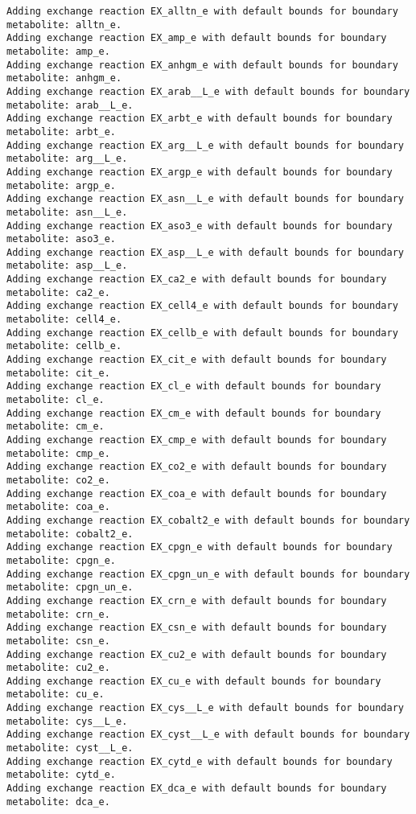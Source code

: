 \documentclass[
  letterpaper,
  DIV=11,
  numbers=noendperiod]{scrartcl}
\begin{document}
\begin{verbatim}
Adding exchange reaction EX_alltn_e with default bounds for boundary metabolite: alltn_e.
Adding exchange reaction EX_amp_e with default bounds for boundary metabolite: amp_e.
Adding exchange reaction EX_anhgm_e with default bounds for boundary metabolite: anhgm_e.
Adding exchange reaction EX_arab__L_e with default bounds for boundary metabolite: arab__L_e.
Adding exchange reaction EX_arbt_e with default bounds for boundary metabolite: arbt_e.
Adding exchange reaction EX_arg__L_e with default bounds for boundary metabolite: arg__L_e.
Adding exchange reaction EX_argp_e with default bounds for boundary metabolite: argp_e.
Adding exchange reaction EX_asn__L_e with default bounds for boundary metabolite: asn__L_e.
Adding exchange reaction EX_aso3_e with default bounds for boundary metabolite: aso3_e.
Adding exchange reaction EX_asp__L_e with default bounds for boundary metabolite: asp__L_e.
Adding exchange reaction EX_ca2_e with default bounds for boundary metabolite: ca2_e.
Adding exchange reaction EX_cell4_e with default bounds for boundary metabolite: cell4_e.
Adding exchange reaction EX_cellb_e with default bounds for boundary metabolite: cellb_e.
Adding exchange reaction EX_cit_e with default bounds for boundary metabolite: cit_e.
Adding exchange reaction EX_cl_e with default bounds for boundary metabolite: cl_e.
Adding exchange reaction EX_cm_e with default bounds for boundary metabolite: cm_e.
Adding exchange reaction EX_cmp_e with default bounds for boundary metabolite: cmp_e.
Adding exchange reaction EX_co2_e with default bounds for boundary metabolite: co2_e.
Adding exchange reaction EX_coa_e with default bounds for boundary metabolite: coa_e.
Adding exchange reaction EX_cobalt2_e with default bounds for boundary metabolite: cobalt2_e.
Adding exchange reaction EX_cpgn_e with default bounds for boundary metabolite: cpgn_e.
Adding exchange reaction EX_cpgn_un_e with default bounds for boundary metabolite: cpgn_un_e.
Adding exchange reaction EX_crn_e with default bounds for boundary metabolite: crn_e.
Adding exchange reaction EX_csn_e with default bounds for boundary metabolite: csn_e.
Adding exchange reaction EX_cu2_e with default bounds for boundary metabolite: cu2_e.
Adding exchange reaction EX_cu_e with default bounds for boundary metabolite: cu_e.
Adding exchange reaction EX_cys__L_e with default bounds for boundary metabolite: cys__L_e.
Adding exchange reaction EX_cyst__L_e with default bounds for boundary metabolite: cyst__L_e.
Adding exchange reaction EX_cytd_e with default bounds for boundary metabolite: cytd_e.
Adding exchange reaction EX_dca_e with default bounds for boundary metabolite: dca_e.

\end{verbatim}
\end{document}
